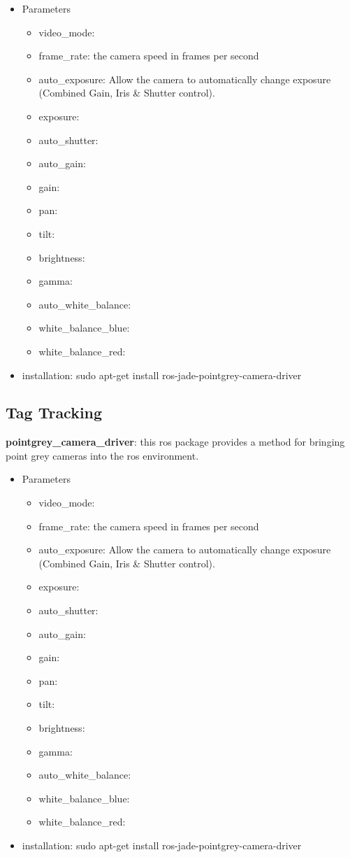 \begin{itemize}
\item Parameters
\begin{itemize}
\item video\_mode:
\item frame\_rate:  the camera speed in frames per second
\item auto\_exposure:  Allow the camera to automatically change exposure (Combined Gain, Iris \& Shutter control).
\item exposure: 
\item auto\_shutter:
\item auto\_gain:
\item gain:
\item pan:
\item tilt:
\item brightness:
\item gamma:
\item auto\_white\_balance:
\item white\_balance\_blue:
\item white\_balance\_red:
\end{itemize}
\item installation: sudo apt-get install ros-jade-pointgrey-camera-driver
\end{itemize}

\subsection{Tag Tracking}
\noindent \textbf{pointgrey\_camera\_driver}: this ros package provides a method for bringing point grey cameras into the ros environment. 

\begin{itemize}
\item Parameters
\begin{itemize}
\item video\_mode:
\item frame\_rate:  the camera speed in frames per second
\item auto\_exposure:  Allow the camera to automatically change exposure (Combined Gain, Iris \& Shutter control).
\item exposure: 
\item auto\_shutter:
\item auto\_gain:
\item gain:
\item pan:
\item tilt:
\item brightness:
\item gamma:
\item auto\_white\_balance:
\item white\_balance\_blue:
\item white\_balance\_red:
\end{itemize}
\item installation: sudo apt-get install ros-jade-pointgrey-camera-driver
\end{itemize}

